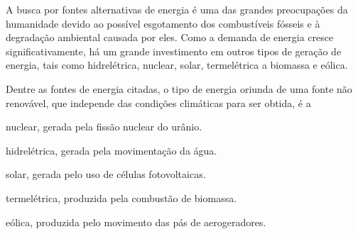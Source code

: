 A busca por fontes alternativas de energia é uma das grandes preocupações da humanidade devido ao possível esgotamento dos combustíveis fósseis e à degradação ambiental causada por eles. Como a demanda de energia cresce significativamente, há um grande investimento em outros tipos de geração de energia, tais como hidrelétrica, nuclear, solar, termelétrica a biomassa e eólica.\par
{}
Dentre as fontes de energia citadas, o tipo de energia oriunda de uma fonte não renovável, que independe das condições climáticas para ser obtida, é a\par
\begin{alternativas}
  \item nuclear, gerada pela fissão nuclear do urânio.
  \item hidrelétrica, gerada pela movimentação da água.
  \item solar, gerada pelo uso de células fotovoltaicas.
  \item termelétrica, produzida pela combustão de biomassa.
  \item eólica, produzida pelo movimento das pás de aerogeradores.
\end{alternativas}
